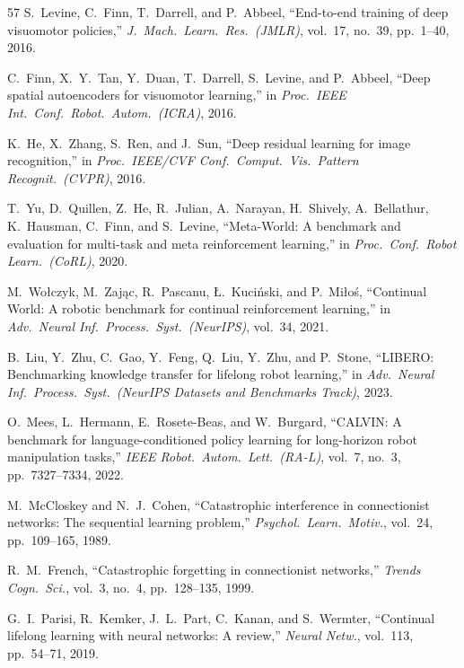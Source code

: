 \documentclass[10pt]{article}
\begin{document}
\begin{thebibliography}{57}
S.~Levine, C.~Finn, T.~Darrell, and P.~Abbeel, ``End-to-end training of deep visuomotor policies,'' \emph{J.\ Mach.\ Learn.\ Res.\ (JMLR)}, vol.~17, no.~39, pp.~1--40, 2016.

C.~Finn, X.~Y.~Tan, Y.~Duan, T.~Darrell, S.~Levine, and P.~Abbeel, ``Deep spatial autoencoders for visuomotor learning,'' in \emph{Proc.\ IEEE Int.\ Conf.\ Robot.\ Autom.\ (ICRA)}, 2016.

K.~He, X.~Zhang, S.~Ren, and J.~Sun, ``Deep residual learning for image recognition,'' in \emph{Proc.\ IEEE/CVF Conf.\ Comput.\ Vis.\ Pattern Recognit.\ (CVPR)}, 2016.

T.~Yu, D.~Quillen, Z.~He, R.~Julian, A.~Narayan, H.~Shively, A.~Bellathur, K.~Hausman, C.~Finn, and S.~Levine, ``Meta-World: A benchmark and evaluation for multi-task and meta reinforcement learning,'' in \emph{Proc.\ Conf.\ Robot Learn.\ (CoRL)}, 2020.

M.~Wo{\l}czyk, M.~Zaj{\k{a}}c, R.~Pascanu, {\L}.~Kuci{\'n}ski, and P.~Mi{\l}o{\'s}, ``Continual World: A robotic benchmark for continual reinforcement learning,'' in \emph{Adv.\ Neural Inf.\ Process.\ Syst.\ (NeurIPS)}, vol.~34, 2021.

B.~Liu, Y.~Zhu, C.~Gao, Y.~Feng, Q.~Liu, Y.~Zhu, and P.~Stone, ``LIBERO: Benchmarking knowledge transfer for lifelong robot learning,'' in \emph{Adv.\ Neural Inf.\ Process.\ Syst.\ (NeurIPS Datasets and Benchmarks Track)}, 2023.

O.~Mees, L.~Hermann, E.~Rosete-Beas, and W.~Burgard, ``CALVIN: A benchmark for language-conditioned policy learning for long-horizon robot manipulation tasks,'' \emph{IEEE Robot.\ Autom.\ Lett.\ (RA-L)}, vol.~7, no.~3, pp.~7327--7334, 2022.

M.~McCloskey and N.~J.~Cohen, ``Catastrophic interference in connectionist networks: The sequential learning problem,'' \emph{Psychol.\ Learn.\ Motiv.}, vol.~24, pp.~109--165, 1989.

R.~M.~French, ``Catastrophic forgetting in connectionist networks,'' \emph{Trends Cogn.\ Sci.}, vol.~3, no.~4, pp.~128--135, 1999.

G.~I.~Parisi, R.~Kemker, J.~L.~Part, C.~Kanan, and S.~Wermter, ``Continual lifelong learning with neural networks: A review,'' \emph{Neural Netw.}, vol.~113, pp.~54--71, 2019.


\end{thebibliography}
\end{document}
